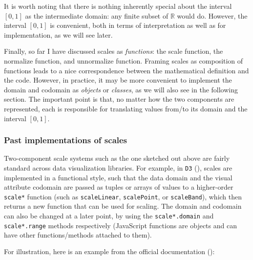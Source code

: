 \documentclass[
]{book}
\theoremstyle{definition}
\theoremstyle{definition}
\theoremstyle{definition}
\theoremstyle{definition}
\theoremstyle{remark}
\begin{document}
It is worth noting that there is nothing inherently special about the interval \([0, 1]\) as the intermediate domain: any finite subset of \(\mathbb{R}\) would do. However, the interval \([0, 1]\) is convenient, both in terms of interpretation as well as for implementation, as we will see later.

Finally, so far I have discussed scales as \emph{functions}: the scale function, the normalize function, and unnormalize function. Framing scales as composition of functions leads to a nice correspondence between the mathematical definition and the code. However, in practice, it may be more convenient to implement the domain and codomain as \emph{objects} or \emph{classes}, as we will also see in the following section. The important point is that, no matter how the two components are represented, each is responsible for translating values from/to its domain and the interval \([0, 1]\).

\subsubsection{Past implementations of scales}\label{past-implementations-of-scales}

Two-component scale systems such as the one sketched out above are fairly standard across data visualization libraries. For example, in \texttt{D3} (), scales are implemented in a functional style, such that the data domain and the visual attribute codomain are passed as tuples or arrays of values to a higher-order \texttt{scale*} function (such as \texttt{scaleLinear}, \texttt{scalePoint}, or \texttt{scaleBand}), which then returns a new function that can be used for scaling. The domain and codomain can also be changed at a later point, by using the \texttt{scale*.domain} and \texttt{scale*.range} methods respectively (JavaScript functions are objects and can have other functions/methods attached to them).

For illustration, here is an example from the official documentation ():
\end{document}
